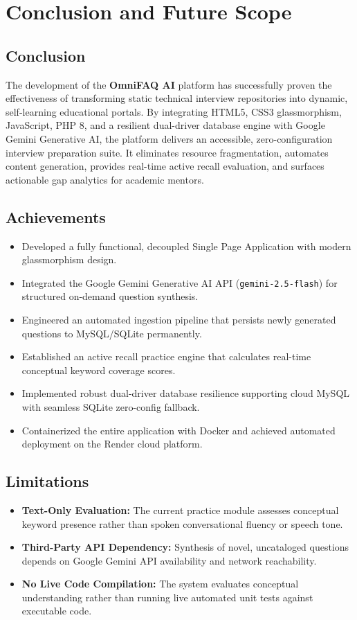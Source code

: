 \chapter{Conclusion and Future Scope}

\section{Conclusion}
The development of the \textbf{OmniFAQ AI} platform has successfully proven the effectiveness of transforming static technical interview repositories into dynamic, self-learning educational portals. By integrating HTML5, CSS3 glassmorphism, JavaScript, PHP 8, and a resilient dual-driver database engine with Google Gemini Generative AI, the platform delivers an accessible, zero-configuration interview preparation suite. It eliminates resource fragmentation, automates content generation, provides real-time active recall evaluation, and surfaces actionable gap analytics for academic mentors.

\section{Achievements}
\begin{itemize}
    \item Developed a fully functional, decoupled Single Page Application with modern glassmorphism design.
    \item Integrated the Google Gemini Generative AI API (\texttt{gemini-2.5-flash}) for structured on-demand question synthesis.
    \item Engineered an automated ingestion pipeline that persists newly generated questions to MySQL/SQLite permanently.
    \item Established an active recall practice engine that calculates real-time conceptual keyword coverage scores.
    \item Implemented robust dual-driver database resilience supporting cloud MySQL with seamless SQLite zero-config fallback.
    \item Containerized the entire application with Docker and achieved automated deployment on the Render cloud platform.
\end{itemize}

\section{Limitations}
\begin{itemize}
    \item \textbf{Text-Only Evaluation:} The current practice module assesses conceptual keyword presence rather than spoken conversational fluency or speech tone.
    \item \textbf{Third-Party API Dependency:} Synthesis of novel, uncataloged questions depends on Google Gemini API availability and network reachability.
    \item \textbf{No Live Code Compilation:} The system evaluates conceptual understanding rather than running live automated unit tests against executable code.
\end{itemize}

